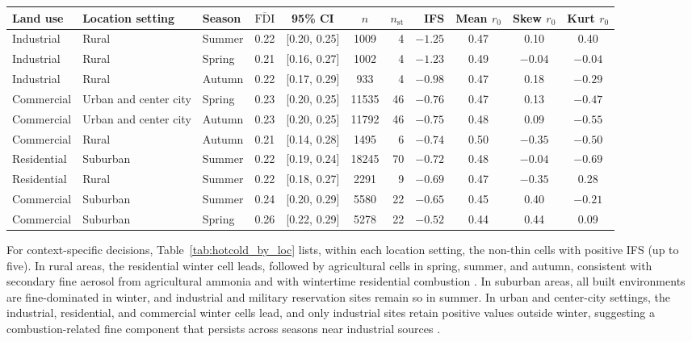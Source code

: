 \documentclass[a4paper,fleqn]{cas-sc}
\begin{document}
\begin{table}[!htbp]
\begin{tabular}{lllcccrrccc}
\midrule
\textbf{Land use} & \textbf{Location setting} & \textbf{Season} & \textbf{$\overline{\mathrm{FDI}}$} & \textbf{95\% CI} & \textbf{$n$} & \textbf{$n_{\mathrm{st}}$} & \textbf{IFS} & \textbf{Mean $r_0$} & \textbf{Skew $r_0$} & \textbf{Kurt $r_0$} \\
\midrule
Industrial & Rural & Summer & 0.22 & [0.20, 0.25] & 1009 & 4 & $-1.25$ & 0.47 & 0.10 & 0.40 \\
Industrial & Rural & Spring & 0.21 & [0.16, 0.27] & 1002 & 4 & $-1.23$ & 0.49 & $-0.04$ & $-0.04$ \\
Industrial & Rural & Autumn & 0.22 & [0.17, 0.29] & 933 & 4 & $-0.98$ & 0.47 & 0.18 & $-0.29$ \\
Commercial & Urban and center city & Spring & 0.23 & [0.20, 0.25] & 11535 & 46 & $-0.76$ & 0.47 & 0.13 & $-0.47$ \\
Commercial & Urban and center city & Autumn & 0.23 & [0.20, 0.25] & 11792 & 46 & $-0.75$ & 0.48 & 0.09 & $-0.55$ \\
Commercial & Rural & Autumn & 0.21 & [0.14, 0.28] & 1495 & 6 & $-0.74$ & 0.50 & $-0.35$ & $-0.50$ \\
Residential & Suburban & Summer & 0.22 & [0.19, 0.24] & 18245 & 70 & $-0.72$ & 0.48 & $-0.04$ & $-0.69$ \\
Residential & Rural & Summer & 0.22 & [0.18, 0.27] & 2291 & 9 & $-0.69$ & 0.47 & $-0.35$ & 0.28 \\
Commercial & Suburban & Summer & 0.24 & [0.20, 0.29] & 5580 & 22 & $-0.65$ & 0.45 & 0.40 & $-0.21$ \\
Commercial & Suburban & Spring & 0.26 & [0.22, 0.29] & 5278 & 22 & $-0.52$ & 0.44 & 0.44 & 0.09 \\
\bottomrule
\end{tabular}
\end{table}

For context-specific decisions, Table~\ref{tab:hotcold_by_loc} lists, within each location setting, the non-thin cells with positive IFS (up to five). In rural areas, the residential winter cell leads, followed by agricultural cells in spring, summer, and autumn, consistent with secondary fine aerosol from agricultural ammonia and with wintertime residential combustion \citep{Burns2023, Jandacka2024}. In suburban areas, all built environments are fine-dominated in winter, and industrial and military reservation sites remain so in summer. In urban and center-city settings, the industrial, residential, and commercial winter cells lead, and only industrial sites retain positive values outside winter, suggesting a combustion-related fine component that persists across seasons near industrial sources \citep{Cummings2021}.
\end{document}

